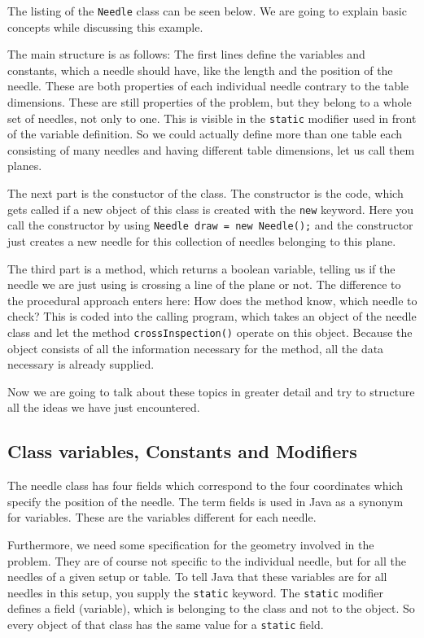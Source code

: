The listing of the \verb|Needle| class can be seen below. We are going
to explain basic concepts while discussing this example.

The main structure is as follows: The first lines define the 
variables and constants, which a needle should have, like the
length and the position of the needle. These are both properties of
each individual needle contrary to the table dimensions. These are 
still properties of the problem, but they belong to a whole set of 
needles, not only to one. This is visible in the \verb|static| modifier
used in front of the variable definition. So we could actually define
more than one table each consisting of many needles and having different
table dimensions, let us call them planes.

The next part is the constuctor of the class. The constructor is
the code, which gets called if a new object of this class is created with
the \verb|new| keyword. Here you call the constructor by using
\verb|Needle draw = new Needle();| and the constructor just creates
a new needle for this collection of needles belonging to this plane. 

The third part is a method, which returns a boolean variable,
telling us if the needle we are just using is crossing a line of the plane
or not. The difference to the procedural approach enters here: 
How does the method know, which needle to check? This is coded into
the calling program, which takes an object of the needle class
and let the method \verb|crossInspection()| operate on this object. Because
the object consists of all the information necessary for the method,
all the data necessary is already supplied.

Now we are going to talk about these topics in greater detail and try 
to structure all the ideas we have just encountered.


\subsection{Class variables, Constants and Modifiers}
The needle class has four fields which correspond to the four
coordinates which specify the position of the needle. 
The term fields is used in Java as a synonym for variables.
These are the variables different for each needle.

Furthermore, we
need some specification for the geometry involved in the problem.
They are of course not specific to the individual needle, but for
all the needles of a given setup or table. To tell Java that these
variables are for all needles in this setup, you supply the
\verb|static| keyword. The \verb|static| modifier 
defines a field (variable), which is belonging
to the class and not to the object. So every object of that class 
has the same value for a \verb|static| field. 

